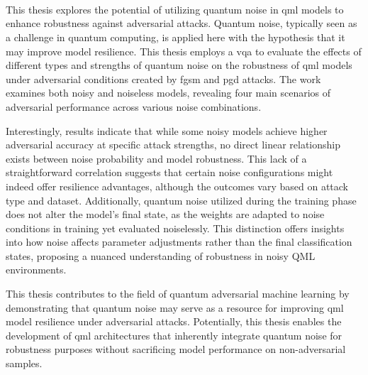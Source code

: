 \chapter{\abstractname} \

This thesis explores the potential of utilizing quantum noise in \acl{qml}
models to enhance robustness against adversarial attacks. Quantum noise,
typically seen as a challenge in quantum computing, is applied here with
the hypothesis that it may improve model resilience. This thesis employs a
\acl{vqa} to evaluate the effects of different types and strengths of
quantum noise on the robustness of \ac{qml} models under adversarial
conditions created by \acl{fgsm} and \acl{pgd} attacks. The work examines
both noisy and noiseless models, revealing four main scenarios of
adversarial performance across various noise combinations. \

Interestingly, results indicate that while some noisy models achieve
higher adversarial accuracy at specific attack strengths, no
direct linear relationship exists between noise probability and
model robustness. This lack of a straightforward correlation suggests
that certain noise configurations might indeed offer resilience advantages,
although the outcomes vary based on attack type and dataset. Additionally,
quantum noise utilized during the training phase does not alter the model's
final state, as the weights are adapted to noise conditions in
training yet evaluated noiselessly. This distinction offers
insights into how noise affects parameter adjustments rather
than the final classification states, proposing a nuanced
understanding of robustness in noisy QML environments. \

This thesis contributes to the field of quantum adversarial machine
learning by demonstrating that quantum noise may serve as a resource
for improving \acl{qml} model resilience under adversarial attacks. 
Potentially, this thesis enables the development of \ac{qml}
architectures that inherently integrate quantum noise for
robustness purposes without sacrificing model performance on
non-adversarial samples. \